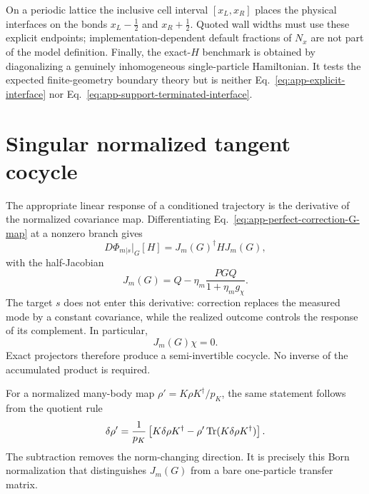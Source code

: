 On a periodic lattice the inclusive cell interval \([x_L,x_R]\) places the
physical interfaces on the bonds \(x_L-\tfrac12\) and
\(x_R+\tfrac12\).  Quoted wall widths must use these explicit endpoints;
implementation-dependent default fractions of \(N_x\) are not part of the
model definition.  Finally, the exact-$H$ benchmark is obtained by
diagonalizing a genuinely inhomogeneous single-particle Hamiltonian.  It
tests the expected finite-geometry boundary theory but is neither
Eq.~\eqref{eq:app-explicit-interface} nor
Eq.~\eqref{eq:app-support-terminated-interface}.


\section{Singular normalized tangent cocycle}
\label{app:tangent-cocycle}

The appropriate linear response of a conditioned trajectory is the
derivative of the normalized covariance map.  Differentiating
Eq.~\eqref{eq:app-perfect-correction-G-map} at a nonzero branch gives
\begin{equation}
    D\Phi_{m|s}\big|_G[H]
    =J_m(G)^\dagger HJ_m(G),
    \label{eq:app-tangent-congruence}
\end{equation}
with the half-Jacobian
\begin{equation}
    \boxed{
    J_m(G)
    =Q-\eta_m\frac{PGQ}{1+\eta_m g_\chi}.}
    \label{eq:app-projective-half-jacobian}
\end{equation}
The target \(s\) does not enter this derivative: correction replaces the
measured mode by a constant covariance, while the realized outcome controls
the response of its complement.  In particular,
\begin{equation}
    J_m(G)\chi=0.
    \label{eq:app-half-jacobian-null}
\end{equation}
Exact projectors therefore produce a semi-invertible cocycle.  No inverse of
the accumulated product is required.

For a normalized many-body map
\(\rho'=K\rho K^\dagger/p_K\), the same statement follows from the quotient
rule
\begin{equation}
    \delta\rho'
    =\frac{1}{p_K}\left[
      K\delta\rho K^\dagger
      -\rho'\operatorname{Tr}(K\delta\rho K^\dagger)
    \right].
    \label{eq:app-many-body-quotient-rule}
\end{equation}
The subtraction removes the norm-changing direction.  It is precisely this
Born normalization that distinguishes \(J_m(G)\) from a bare one-particle
transfer matrix.

